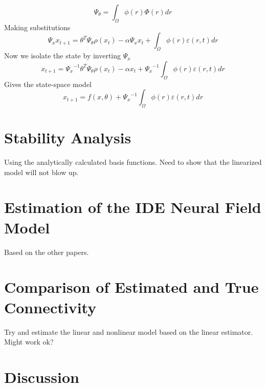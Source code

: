 \documentclass[onecolumn,draftcls]{IEEEtran}
\begin{document}
\begin{equation}\label{Def6}
{\Psi _\theta } = \int_\Omega  {\phi \left( r \right)\Phi \left( r \right)dr}
\end{equation}
Making substitutions
\begin{equation}\label{Subs3}
{\Psi _x}{x_{t + 1}} = {\theta ^T}{\Psi _\theta }\rho \left( {{x_t}} \right) - \alpha {\Psi _x}{x_t} + \int_\Omega  {\phi \left( r \right)\varepsilon \left( {r,t} \right)dr}
\end{equation}
Now we isolate the state by inverting $\Psi_x$
\begin{equation}\label{IsolateState}
{x_{t + 1}} = {\Psi _x}^{ - 1}{\theta ^T}{\Psi _\theta }\rho \left( {{x_t}} \right) - \alpha {x_t} + {\Psi _x}^{ - 1}\int_\Omega  {\phi \left( r \right)\varepsilon \left( {r,t} \right)dr}
\end{equation}
Gives the state-space model
\begin{equation}\label{StateSpaceModel}
{x_{t + 1}} = f\left( {x,\theta } \right) + {\Psi _x}^{ - 1}\int_\Omega  {\phi \left( r \right)\varepsilon \left( {r,t} \right)dr}
\end{equation}

\section{Stability Analysis}
Using the analytically calculated basis functions. Need to show that the linearized model will not blow up.

\section{Estimation of the IDE Neural Field Model}
Based on the other papers.

\section{Comparison of Estimated and True Connectivity}
Try and estimate the linear and nonlinear model based on the linear estimator. Might work ok?

\section{Discussion}
\end{document}
